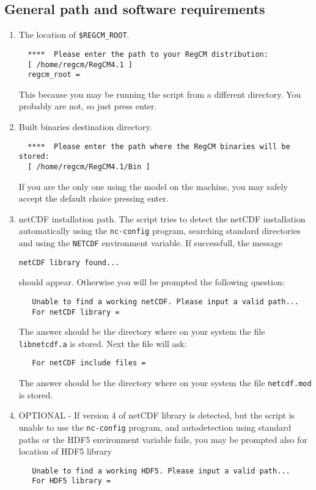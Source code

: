 \subsection{General path and software requirements}
\begin{enumerate}
\item The location of \verb=$REGCM_ROOT=.
\begin{Verbatim}
  ****  Please enter the path to your RegCM distribution: 
  [ /home/regcm/RegCM4.1 ]
  regcm_root =
\end{Verbatim}
This because you may be running the script from a different directory.
You probably are not, so just press enter.
\item Built binaries destination directory.
\begin{Verbatim}
  ****  Please enter the path where the RegCM binaries will be stored: 
  [ /home/regcm/RegCM4.1/Bin ]
\end{Verbatim}
If you are the only one using the model on the machine, you may safely
accept the default choice pressing enter.
\item netCDF installation path. The script tries to detect the netCDF
installation automatically using the \verb=nc-config= program, searching
standard directories and using the \verb=NETCDF= environment variable.
If successfull, the message
\begin{Verbatim}
netCDF library found...
\end{Verbatim}
should appear. Otherwise you will be prompted the following question:
\begin{Verbatim}
   Unable to find a working netCDF. Please input a valid path...
   For netCDF library =
\end{Verbatim}
The answer should be the directory where on your system the file
\verb=libnetcdf.a= is stored. Next the file will ask:
\begin{Verbatim}
   For netCDF include files =
\end{Verbatim}
The answer should be the directory where on your system the file
\verb=netcdf.mod= is stored.
\item OPTIONAL - If version 4 of netCDF library is detected, but the
script is unable to use the \verb=nc-config= program, and autodetection
using standard paths or the HDF5 environment variable fails, you may be
prompted also for location of HDF5 library
\begin{Verbatim}
   Unable to find a working HDF5. Please input a valid path...
   For HDF5 library =
\end{Verbatim}

\end{enumerate}
